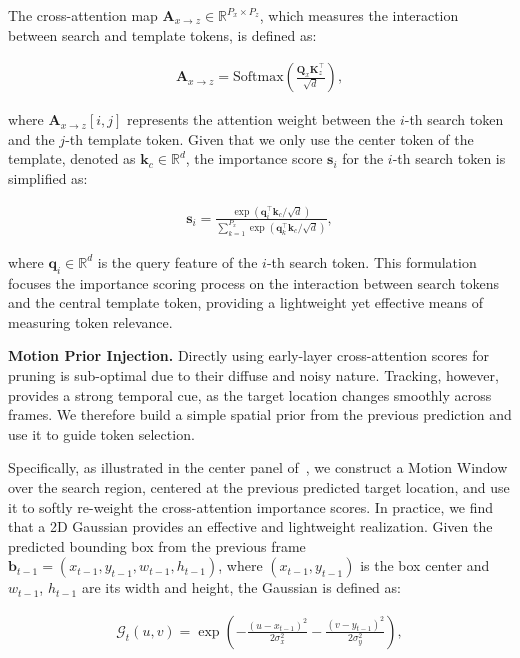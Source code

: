 The cross-attention map $\mathbf{A}_{x \to z} \in \mathbb{R}^{P_x \times P_z}$, which measures the interaction between search and template tokens, is defined as:

\begin{align}
\mathbf{A}_{x \to z} = \text{Softmax} \left( \frac{\mathbf{Q}_x \mathbf{K}_z^\top}{\sqrt{d}} \right),
\end{align}

where $\mathbf{A}_{x \to z}[i, j]$ represents the attention weight between the $i$-th search token and the $j$-th template token. Given that we only use the center token of the template, denoted as $\mathbf{k}_c \in \mathbb{R}^d$, the importance score $\mathbf{s}_i$ for the $i$-th search token is simplified as:

\vskip -0.2in
\begin{align}
\mathbf{s}_i = \frac{\exp \left( \mathbf{q}_i^\top \mathbf{k}_c / \sqrt{d} \right)}{\sum_{k=1}^{P_x} \exp \left( \mathbf{q}_k^\top \mathbf{k}_c / \sqrt{d} \right)},
\end{align}

where $\mathbf{q}_i \in \mathbb{R}^d$ is the query feature of the $i$-th search token. This formulation focuses the importance scoring process on the interaction between search tokens and the central template token, providing a lightweight yet effective means of measuring token relevance.


\textbf{Motion Prior Injection.} Directly using early-layer cross-attention scores for pruning is sub-optimal due to their diffuse and noisy nature. Tracking, however, provides a strong temporal cue, as the target location changes smoothly across frames. We therefore build a simple spatial prior from the previous prediction and use it to guide token selection.

Specifically, as illustrated in the center panel of~, we construct a Motion Window over the search region, centered at the previous predicted target location, and use it to softly re-weight the cross-attention importance scores. In practice, we find that a 2D Gaussian provides an effective and lightweight realization. Given the predicted bounding box from the previous frame $\mathbf{b}_{t-1} = (x_{t-1}, y_{t-1}, w_{t-1}, h_{t-1})$, where $(x_{t-1}, y_{t-1})$ is the box center and $w_{t-1}$, $h_{t-1}$ are its width and height, the Gaussian is defined as:

\begin{align}
    \mathcal{G}_t(u, v) = \exp \left( -\frac{(u - x_{t-1})^2}{2 \sigma_x^2} - \frac{(v - y_{t-1})^2}{2 \sigma_y^2} \right),
\end{align}

